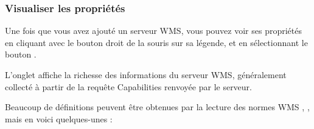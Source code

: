 
\subsubsection{Visualiser les propri\'et\'es}
\label{sec:ogc-wms-properties}

Une fois que vous avez ajout\'e un serveur WMS, vous pouvez voir ses propri\'et\'es
en cliquant avec le bouton droit de la souris sur sa l\'egende, et en
s\'electionnant le bouton  .

\label{sec:ogc-wms-properties-metadata}

L'onglet  affiche la richesse des informations du serveur WMS,
g\'en\'eralement collect\'e \`a partir de la requ\^ete Capabilities renvoy\'ee par le
serveur.

Beaucoup de d\'efinitions peuvent \^etre obtenues par la lecture des normes WMS
\cite{OGCWMS010101web}, \cite{OGCWMS010300web}, mais en voici quelques-unes :

